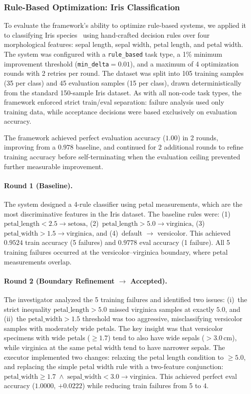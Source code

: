 \subsubsection{Rule-Based Optimization: Iris Classification}
\label{sec:experiment-iris}

To evaluate the framework's ability to optimize rule-based systems, we applied it to classifying Iris species~\cite{fisher1936use} using hand-crafted decision rules over four morphological features: sepal length, sepal width, petal length, and petal width. The system was configured with a \texttt{rule\_based} task type, a 1\% minimum improvement threshold (\texttt{min\_delta}${}= 0.01$), and a maximum of 4 optimization rounds with 2 retries per round. The dataset was split into 105 training samples (35 per class) and 45 evaluation samples (15 per class), drawn deterministically from the standard 150-sample Iris dataset. As with all non-code task types, the framework enforced strict train/eval separation: failure analysis used only training data, while acceptance decisions were based exclusively on evaluation accuracy.

The framework achieved perfect evaluation accuracy ($1.00$) in 2 rounds, improving from a $0.978$ baseline, and continued for 2 additional rounds to refine training accuracy before self-terminating when the evaluation ceiling prevented further measurable improvement.

\paragraph{Round 1 (Baseline).}
The system designed a 4-rule classifier using petal measurements, which are the most discriminative features in the Iris dataset. The baseline rules were: (1)~$\text{petal\_length} < 2.5 \to \text{setosa}$, (2)~$\text{petal\_length} > 5.0 \to \text{virginica}$, (3)~$\text{petal\_width} > 1.5 \to \text{virginica}$, and (4)~default $\to$ versicolor. This achieved $0.9524$ train accuracy (5 failures) and $0.9778$ eval accuracy (1 failure). All 5 training failures occurred at the versicolor--virginica boundary, where petal measurements overlap.

\paragraph{Round 2 (Boundary Refinement $\to$ Accepted).}
The investigator analyzed the 5 training failures and identified two issues: (i)~the strict inequality $\text{petal\_length} > 5.0$ missed virginica samples at exactly $5.0$, and (ii)~the $\text{petal\_width} > 1.5$ threshold was too aggressive, misclassifying versicolor samples with moderately wide petals. The key insight was that versicolor specimens with wide petals ($\geq 1.7$) tend to also have wide sepals ($> 3.0$\,cm), while virginica at the same petal width tend to have narrower sepals. The executor implemented two changes: relaxing the petal length condition to $\geq 5.0$, and replacing the simple petal width rule with a two-feature conjunction: $\text{petal\_width} \geq 1.7 \;\land\; \text{sepal\_width} < 3.0 \to \text{virginica}$. This achieved perfect eval accuracy ($1.0000$, $+0.0222$) while reducing train failures from 5 to 4.


